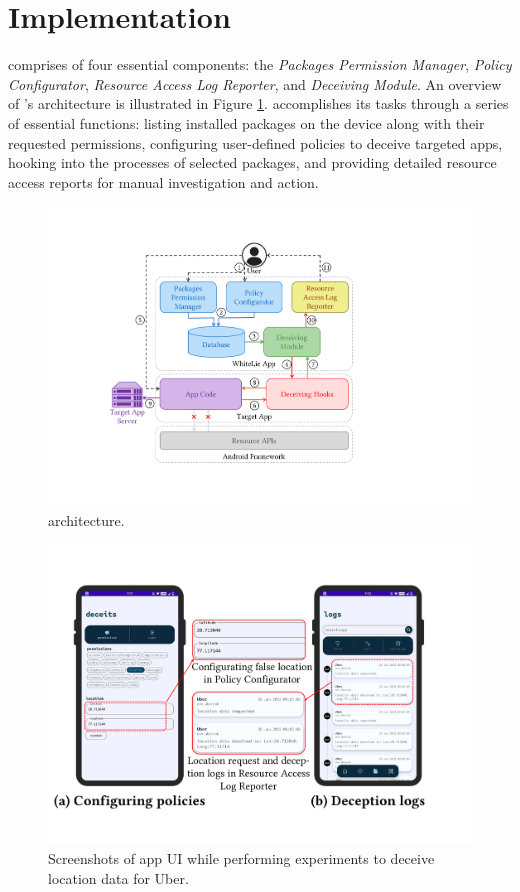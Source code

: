 \section{Implementation}
\label{sec:architecture}

\framework{} comprises of four essential components: the \textit{Packages Permission Manager}, \textit{Policy Configurator}, \textit{Resource Access Log Reporter}, and \textit{Deceiving Module}. An overview of \framework{}'s architecture is illustrated in Figure \ref{fig:method_frmwrkArch}. \framework{} accomplishes its tasks through a series of essential functions: listing installed packages on the device along with their requested permissions, configuring user-defined policies to deceive targeted apps, hooking into the processes of selected packages, and providing detailed resource access reports for manual investigation and action.

\begin{figure}[t]
    \centering
    \includegraphics[width=0.75\linewidth]{Figures/Methodology/deceiver_working_architecture.pdf}
    \caption{\framework{} architecture.}
    \label{fig:method_frmwrkArch}
\end{figure}

\begin{figure}[t]
    \centering
    \includegraphics[width=0.75\linewidth]{Figures/Case Studies/whitelie_screenshots.pdf}
    \caption{Screenshots of \framework{} app UI while performing experiments to deceive location data for Uber.}
    \label{fig:frmwrk-ui}
\end{figure}

